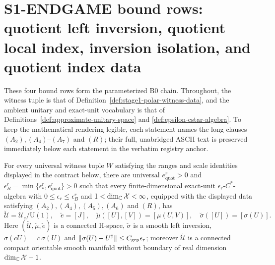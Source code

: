 \section{S1-ENDGAME bound rows: quotient left inversion, quotient local index, inversion isolation, and quotient index data}\label{sec:stage1-endgame-bounds}

These four bound rows form the parameterized B0 chain.  Throughout, the witness tuple is
that of Definition~\ref{def:stage1-polar-witness-data}, and the ambient unitary and
exact-unit vocabulary is that of Definitions~\ref{def:approximate-unitary-space} and
\ref{def:epsilon-cstar-algebra}.  To keep the mathematical rendering legible, each
statement names the long clauses $(A_2),(A_4)$--$(A_7)$ and $(R)$; their full, unabridged
ASCII text is preserved immediately below each statement in the verbatim registry anchor.

\begin{lemma}\label{lem:stage1-bound-quotient-left-inversion}
For every universal witness tuple $W$ satisfying the ranges and scale identities displayed
in the contract below, there are universal $e^{r}_{\mathrm{quot}}>0$ and
$\epsilon^{r}_{B}=\min\{\epsilon^{r}_{*},e^{r}_{\mathrm{quot}}\}>0$ such that every
finite-dimensional exact-unit $\epsilon_r$-$C^{*}$-algebra with
$0\le\epsilon_r\le\epsilon^{r}_{B}$ and $1<\dim_{\mathbb C}\mathcal X<\infty$, equipped with
the displayed data satisfying $(A_2),(A_4),(A_5),(A_6)$ and $(R)$, has
\[
 \breve{\mathcal U}=\mathcal U_e/\mathrm U(1),\quad \breve e=[J],\quad
 \breve\mu([U],[V])=[\mu(U,V)],\quad \breve\sigma([U])=[\sigma(U)].
\]
Here $(\breve{\mathcal U},\breve\mu,\breve e)$ is a connected H-space,
$\breve\sigma$ is a smooth left inversion,
$\sigma(cU)=\overline c\,\sigma(U)$ and
$\lVert \sigma(U)-U^{\dagger}\rVert\le C_{\mathrm{grp}}\epsilon_r$; moreover
$\breve{\mathcal U}$ is a connected compact orientable smooth manifold without boundary
of real dimension $\dim_{\mathbb C}\mathcal X-1$.
\end{lemma}

